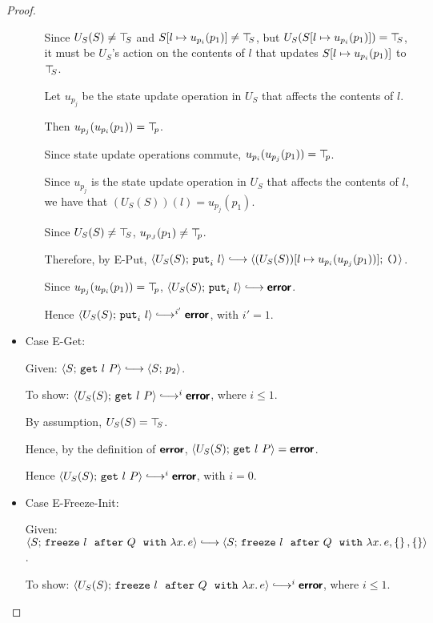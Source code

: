 \begin{proof}
\begin{itemize}
\begin{itemize}
        Since $U_S(S) \neq \top\hspace{-0.85mm}_{S}$ and $S[l \mapsto u_{p_i}(p_1)]
        \neq \top\hspace{-0.85mm}_{S}$, but $U_S(S[l \mapsto u_{p_i}(p_1)]) = \top\hspace{-0.85mm}_{S}$,
        it must be $U_S$'s action on the contents of $l$ that updates
        $S[l \mapsto u_{p_i}(p_1)]$ to $\top\hspace{-0.85mm}_{S}$.

        Let $u_{p_j}$ be the state update operation in $U_S$ that
        affects the contents of $l$.

        Then $u_{p_j}(u_{p_i}(p_1)) = \top\hspace{-0.85mm}_{p}$.

        Since state update operations commute, $u_{p_i}(u_{p_j}(p_1))
        = \top\hspace{-0.85mm}_{p}$.

        Since $u_{p_j}$ is the state update operation in $U_S$ that
        affects the contents of $l$, we have that $(U_S(S))(l) =
        u_{p_j}(p_1)$.

        Since $U_S(S) \neq \top\hspace{-0.85mm}_{S}$, $u_{p_J}(p_1) \neq \top\hspace{-0.85mm}_{p}$.

        Therefore, by {\sc E-Put}, $\config{U_S(S)}{\putiexp{l}}
        \parstepsto
        \config{\extSRaw{(U_S(S))}{l}{u_{p_i}(u_{p_j}(p_1))}}{\unit}$.

        Since $u_{p_j}(u_{p_i}(p_1)) = \top\hspace{-0.85mm}_{p}$,
        $\config{U_S(S)}{\putiexp{l}} \parstepsto \error$.

        Hence $\config{U_S(S)}{\putiexp{l}}
        \parstepsto^{i'} \error$, with $i' = 1$.

    \end{itemize}

  \item Case {\sc E-Get}:

    Given: $\config{S}{\getexp{l}{P}} \parstepsto \config{S}{p_2}$.

    To show: $\config{U_S(S)}{\getexp{l}{P}} \parstepsto^i \error$,
    where $i \leq 1$.

    By assumption, $U_S(S) = \top\hspace{-0.85mm}_{S}$.

    Hence, by the definition of $\textbf{\textsf{error}}$,
    $\langle U_S(S);\, \mbox{\texttt{get}}~l~P \rangle = \textbf{\textsf{error}}$.

    Hence $\config{U_S(S)}{\getexp{l}{P}} \parstepsto^i \error$, with
    $i = 0$.

  \item Case {\sc E-Freeze-Init}:

    Given: $\config{S}{\freezeafter{l}{Q}{\lam{x}{e}}} \parstepsto
    \config{S}{\freezeafterfull{l}{Q}{\lam{x}{e}}{\setof{}}{\setof{}}}$.

    To show: $\config{U_S(S)}{\freezeafter{l}{Q}{\lam{x}{e}}}
    \parstepsto^i \error$, where $i \leq 1$.


\end{itemize}
\end{proof}

